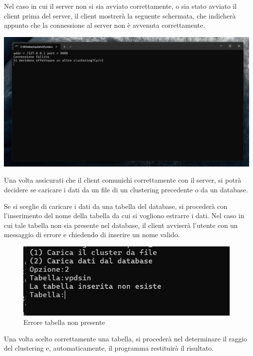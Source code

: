 \begin{tcolorbox}[  colback=white!5!white, colframe=gray, title={Avvertenza} ]

    Nel caso in cui il server non si sia avviato correttamente, o sia stato avviato il client prima del server, il client mostrerà la seguente schermata, che indicherà appunto che la connessione al server non è avvenuta correttamente.
    
    \begin{center} 
        \includegraphics[width = 0.5 \textwidth]{images/connessione fallita.png}
    \end{center}
        
\end{tcolorbox}

Una volta assicurati che il client comunichi correttamente con il server, si potrà decidere se caricare i dati da un file di un clustering precedente o da un database.


Se si sceglie di caricare i dati da una tabella del database, si procederà con l'inserimento del nome della tabella da cui si vogliono estrarre i dati. Nel caso in cui tale tabella non sia presente nel database, il client avviserà l'utente con un messaggio di errore e chiedendo di inserire un nome valido. 

\begin{figure}[h!]
    \centering
    \includegraphics[width = 0.7 \textwidth]{images/teabella inesistente.png}
    \caption{Errore tabella non presente}
\end{figure}

Una volta scelto correttamente una tabella, si procederà nel determinare il raggio del clustering e, automaticamente, il programma restituirà il risultato. 


